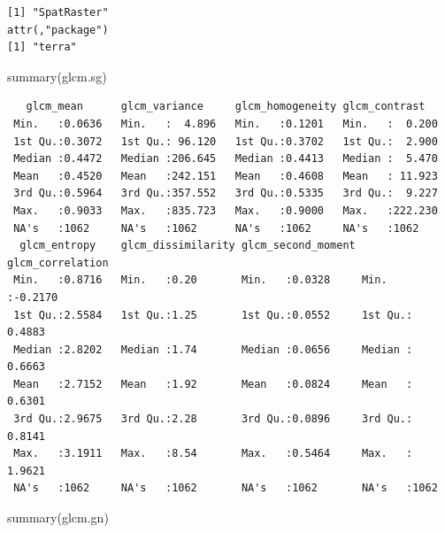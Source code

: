 \documentclass[
  letterpaper,
  DIV=11,
  numbers=noendperiod]{scrartcl}
\newenvironment{Shaded}{\begin{snugshade}}{\end{snugshade}}
\newcommand{\FunctionTok}[1]{\textcolor[rgb]{0.28,0.35,0.67}{#1}}
\newcommand{\NormalTok}[1]{\textcolor[rgb]{0.00,0.23,0.31}{#1}}
\begin{document}
\begin{verbatim}
[1] "SpatRaster"
attr(,"package")
[1] "terra"
\end{verbatim}

\begin{Shaded}
\begin{Highlighting}[]
\FunctionTok{summary}\NormalTok{(glcm.sg)}
\end{Highlighting}
\end{Shaded}

\begin{verbatim}
   glcm_mean      glcm_variance     glcm_homogeneity glcm_contrast    
 Min.   :0.0636   Min.   :  4.896   Min.   :0.1201   Min.   :  0.200  
 1st Qu.:0.3072   1st Qu.: 96.120   1st Qu.:0.3702   1st Qu.:  2.900  
 Median :0.4472   Median :206.645   Median :0.4413   Median :  5.470  
 Mean   :0.4520   Mean   :242.151   Mean   :0.4608   Mean   : 11.923  
 3rd Qu.:0.5964   3rd Qu.:357.552   3rd Qu.:0.5335   3rd Qu.:  9.227  
 Max.   :0.9033   Max.   :835.723   Max.   :0.9000   Max.   :222.230  
 NA's   :1062     NA's   :1062      NA's   :1062     NA's   :1062     
  glcm_entropy    glcm_dissimilarity glcm_second_moment glcm_correlation 
 Min.   :0.8716   Min.   :0.20       Min.   :0.0328     Min.   :-0.2170  
 1st Qu.:2.5584   1st Qu.:1.25       1st Qu.:0.0552     1st Qu.: 0.4883  
 Median :2.8202   Median :1.74       Median :0.0656     Median : 0.6663  
 Mean   :2.7152   Mean   :1.92       Mean   :0.0824     Mean   : 0.6301  
 3rd Qu.:2.9675   3rd Qu.:2.28       3rd Qu.:0.0896     3rd Qu.: 0.8141  
 Max.   :3.1911   Max.   :8.54       Max.   :0.5464     Max.   : 1.9621  
 NA's   :1062     NA's   :1062       NA's   :1062       NA's   :1062     
\end{verbatim}

\begin{Shaded}
\begin{Highlighting}[]
\FunctionTok{summary}\NormalTok{(glcm.gn)}
\end{Highlighting}
\end{Shaded}
\end{document}
